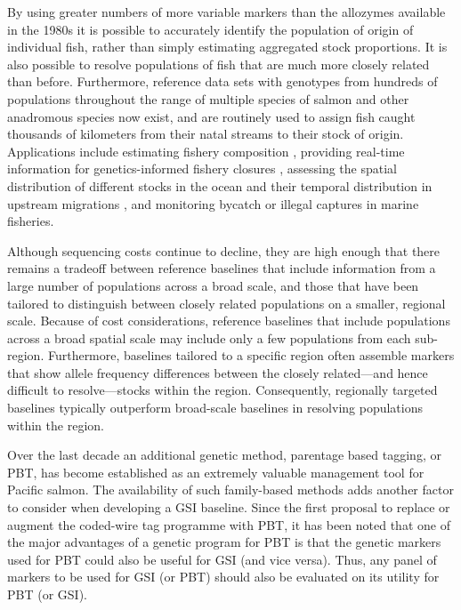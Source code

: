 By using greater numbers of more variable markers than the allozymes available
in the 1980s it is possible to accurately
identify the population of origin of individual fish, rather than simply estimating
aggregated stock proportions.  It is also possible to resolve populations of fish that
are much more closely related than before.  Furthermore, reference data sets with genotypes
from hundreds of populations throughout the range of multiple species of salmon and
other anadromous species
\citep{seeb2007development,gilbey2018microsatellite,barclay2019genetic} now exist, and are routinely used to assign fish caught thousands of
kilometers from their natal streams to their stock of origin. Applications include estimating fishery
composition \citep{satterthwaite2015stock}, providing real-time information for genetics-informed fishery closures \citep{beacham2004dna}, assessing the spatial distribution of different stocks in the
ocean \citep{urawa2009stock} and their temporal distribution in upstream migrations
\citep{hess2014monitoring},  and monitoring  bycatch \citep{hasselman2016genetic} or illegal captures \citep{wilmot1999origins} in marine fisheries.

Although sequencing costs continue to decline, they are high enough
that there remains a tradeoff
between reference baselines that include information from a large number of
populations across a broad scale, and those that have been tailored
to distinguish between closely related populations on a smaller, regional scale.
Because of cost considerations, reference baselines that include populations across a broad
spatial scale may include only a few populations from each sub-region.  Furthermore,
baselines tailored to a specific region often assemble markers that
show allele frequency differences between the closely related---and hence difficult
to resolve---stocks within the region.  Consequently, regionally targeted baselines typically
outperform broad-scale baselines in resolving populations within the region.

Over the last decade an additional genetic method, parentage based tagging, or PBT,
\citep{anderson2005description,steele2019parentage}
has become established as an extremely valuable management
tool for Pacific salmon.  The availability of such family-based methods adds another factor to
consider when developing a GSI baseline.
Since the first proposal \citep{anderson2005description} to replace or augment the coded-wire tag
programme \citep{nandor2010overview}
with PBT, it has been noted that one of the major advantages of a genetic program for
PBT is that the genetic markers used for PBT could also be useful for GSI (and
vice versa).
Thus, any panel of markers to be used for GSI (or PBT) should also be evaluated on its
utility for PBT (or GSI).

